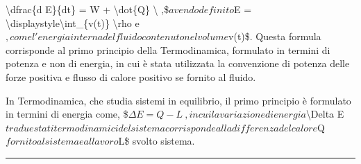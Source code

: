 \documentclass[letterpaper,10pt,italian]{jupyterBook}
\begin{document}
\sphinxAtStartPar
\textbackslash{}dfrac\{d E\}\{dt\} = W + \textbackslash{}dot\{Q\} \textbackslash{} ,\$\( avendo definito
\)E = \textbackslash{}displaystyle\textbackslash{}int\_\{v(t)\} \textbackslash{}rho e\(, come l'energia interna del fluido
contenuto nel volume \)v(t)\$. Questa formula corrisponde al primo
principio della Termodinamica, formulato in termini di potenza e non di
energia, in cui è stata utilizzata la convenzione di potenza delle forze
positiva e flusso di calore positivo se fornito al fluido.%
\begin{footnote}[2]\sphinxAtStartFootnote
In Termodinamica, che studia sistemi in equilibrio, il primo
principio è formulato in termini di energia come,
\$\(\Delta E = Q - L \ ,\)\( in cui la variazione di energia \)\textbackslash{}Delta E\(
tra due stati termodinamici del sistema corrisponde alla differenza
del calore \)Q\( fornito al sistema e al lavoro \)L\$ svolto 
sistema.
%
\end{footnote}


\bigskip\hrule\bigskip


\sphinxstepscope
\end{document}
